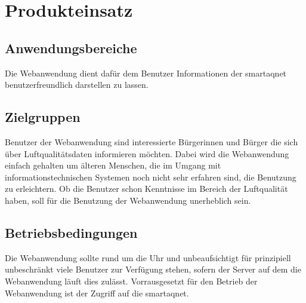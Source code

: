 \section{Produkteinsatz}

\subsection{Anwendungsbereiche}

Die \gls{Webanwendung} dient dafür dem Benutzer Informationen der \gls{smartaqnet} benutzerfreundlich darstellen zu lassen.

\subsection{Zielgruppen}

Benutzer der \gls{Webanwendung} sind interessierte Bürgerinnen und Bürger die sich über Luftqualitätsdaten informieren möchten. 
Dabei wird die \gls{Webanwendung} einfach gehalten um älteren Menschen, die im Umgang mit informationstechnischen Systemen noch nicht sehr erfahren sind, die Benutzung zu erleichtern.
Ob die Benutzer schon Kenntnisse im Bereich der Luftqualität haben, soll für die Benutzung der \gls{Webanwendung} unerheblich sein.

\subsection{Betriebsbedingungen}

Die \gls{Webanwendung} sollte rund um die Uhr und unbeaufsichtigt für prinzipiell unbeschränkt viele Benutzer zur Verfügung stehen, sofern der Server auf dem die \gls{Webanwendung} läuft dies zulässt. 
Vorrausgesetzt für den Betrieb der Webanwendung ist der Zugriff auf die \gls{smartaqnet}.